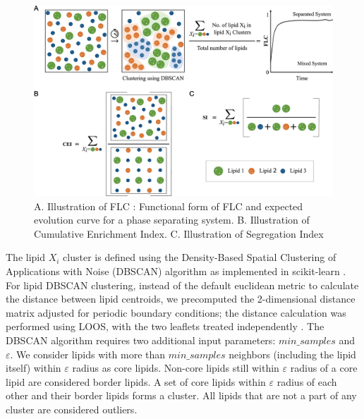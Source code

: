 \documentclass{biophys-new}
\begin{document}
\begin{figure}[hbt!]
\centering
\includegraphics[width=1\linewidth]{Figures/Main/2/placeholder.jpg}
\caption{A. Illustration of FLC :  Functional form of FLC and expected evolution curve for a phase separating system. B. Illustration of Cumulative Enrichment Index. C. Illustration of Segregation Index}
\label{fig2:view}
\end{figure}


The lipid $X_i$ cluster is defined using the Density-Based Spatial Clustering of Applications with Noise (DBSCAN) algorithm \cite{MartinEsterHans-PeterKriegelJiirgSander1996, Ester2017} as implemented in scikit-learn \cite{PedregosaF.VaroquauxG.GramfortA.MichelV.ThirionB.GriselO.BlondelM.PrettenhoferP.WeissR.andDubourgV.VanderplasJ.PassosA.CournapeauD.BrucherM.PerrotM.Duchesnay2011}.
For lipid DBSCAN clustering, instead of the default euclidean metric to calculate the distance between lipid centroids, we precomputed the 2-dimensional distance matrix adjusted for periodic boundary conditions; the distance calculation was performed using LOOS, with the two leaflets treated independently \cite{Romo2014}.
The DBSCAN algorithm requires two additional input parameters: $min\_samples$ and $\varepsilon$.
We consider lipids with more than $min\_samples$ neighbors (including the lipid itself) within $\varepsilon$ radius as core lipids.
Non-core lipids still within $\varepsilon$ radius of a core lipid are considered border lipids.
A set of core lipids within $\varepsilon$ radius of each other and their border lipids forms a cluster.
All lipids that are not a part of any cluster are considered outliers.
\end{document}

